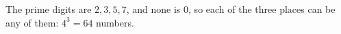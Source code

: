 The prime digits are $2,3,5,7$, and none is $0$, so each of the three places can be any of them: $4^3=\boxed{64}$ numbers.
